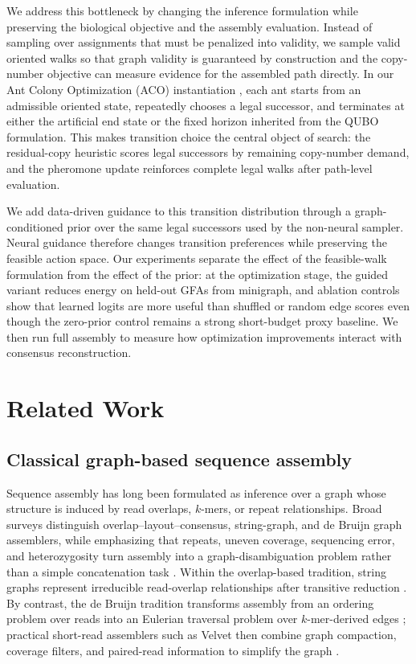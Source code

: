 \documentclass[11pt]{article}
\begin{document}
We address this bottleneck by changing the inference formulation while preserving the biological objective and the assembly evaluation. Instead of sampling over assignments that must be penalized into validity, we sample valid oriented walks so that graph validity is guaranteed by construction and the copy-number objective can measure evidence for the assembled path directly. In our Ant Colony Optimization (ACO) instantiation \citep{dorigo1997acs,dorigo2004aco}, each ant starts from an admissible oriented state, repeatedly chooses a legal successor, and terminates at either the artificial end state or the fixed horizon inherited from the QUBO formulation. This makes transition choice the central object of search: the residual-copy heuristic scores legal successors by remaining copy-number demand, and the pheromone update reinforces complete legal walks after path-level evaluation.

We add data-driven guidance to this transition distribution through a graph-conditioned prior over the same legal successors used by the non-neural sampler. Neural guidance therefore changes transition preferences while preserving the feasible action space. Our experiments separate the effect of the feasible-walk formulation from the effect of the prior: at the optimization stage, the guided variant reduces energy on held-out GFAs from minigraph, and ablation controls show that learned logits are more useful than shuffled or random edge scores even though the zero-prior control remains a strong short-budget proxy baseline. We then run full assembly to measure how optimization improvements interact with consensus reconstruction.


\section{Related Work}
\label{sec:related-work}

\subsection{Classical graph-based sequence assembly}

Sequence assembly has long been formulated as inference over a graph whose structure is induced by read overlaps, $k$-mers, or repeat relationships. Broad surveys distinguish overlap--layout--consensus, string-graph, and de Bruijn graph assemblers, while emphasizing that repeats, uneven coverage, sequencing error, and heterozygosity turn assembly into a graph-disambiguation problem rather than a simple concatenation task \citep{miller2010assembly,nagarajan2013sequence}. Within the overlap-based tradition, string graphs represent irreducible read-overlap relationships after transitive reduction \citep{myers2005stringgraph}. By contrast, the de Bruijn tradition transforms assembly from an ordering problem over reads into an Eulerian traversal problem over $k$-mer-derived edges \citep{pevzner2001eulerian,compeau2011debruijn}; practical short-read assemblers such as Velvet then combine graph compaction, coverage filters, and paired-read information to simplify the graph \citep{zerbino2008velvet}.
\end{document}

